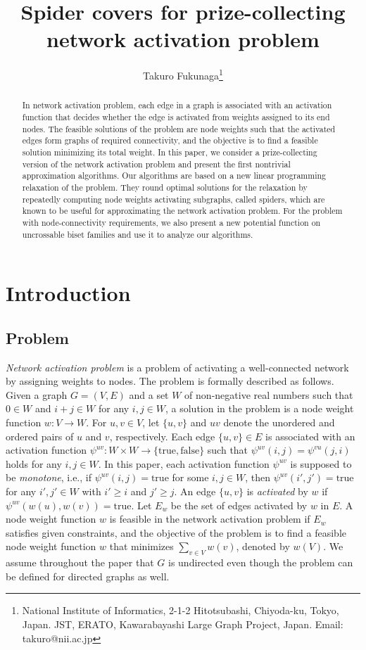 \documentclass[11pt]{article}
\title{Spider covers for prize-collecting network activation problem}
\author{Takuro Fukunaga\footnote{National Institute of Informatics,
2-1-2 Hitotsubashi, Chiyoda-ku, Tokyo, Japan.
JST, ERATO, Kawarabayashi Large Graph Project, Japan.
Email: takuro@nii.ac.jp}}
\date{}
\newcommand{\true}{\mbox{true}}
\newcommand{\false}{\mbox{false}}
\begin{document}
\maketitle
\begin{abstract}
In network activation problem, each edge in a graph is associated with an
 activation function that decides 
 whether the edge is activated from weights assigned
 to its end nodes.
 The feasible solutions of the problem are node weights such that the
 activated edges form graphs of required connectivity,
 and the objective is to find a feasible solution minimizing its total
 weight.
 In this paper, we consider a prize-collecting version of the network
 activation problem and present the first nontrivial approximation algorithms.
 Our algorithms are based on a new linear programming relaxation of the problem.
 They round optimal solutions for the relaxation by repeatedly computing
 node weights
 activating subgraphs, called spiders, which are known to be useful for
 approximating the network activation problem.
 For the problem with node-connectivity requirements, we also present a new
 potential function on uncrossable biset families
 and use it to analyze our algorithms.
\end{abstract}

\section{Introduction}
\subsection{Problem}
{\em Network activation problem}
is a problem of 
activating a well-connected network by assigning weights to
nodes.
The problem is formally described as follows. Given a graph $G=(V,E)$ and
a set $W$ of non-negative real numbers such that $0 \in W$ and
$i + j \in W$ for any $i,j \in W$,
a solution in the problem is a
node weight function $w\colon V \rightarrow W$.
For $u,v\in V$,
let $\{u,v\}$ and $uv$ 
denote the unordered and ordered pairs of $u$ and $v$, respectively.
Each edge $\{u,v\} \in E$ is associated with an activation function $\psi^{uv}: W
\times W \rightarrow \{\true,\false\}$ such that
$\psi^{uv}(i,j)=\psi^{vu}(j,i)$ holds for any $i,j \in W$.
In this paper, each activation function $\psi^{uv}$ is supposed to be
{\em monotone}, i.e.,
if $\psi^{uv}(i,j)=\true$ for some $i,j \in W$,
then $\psi^{uv}(i',j')=\true$ for any $i',j'\in W$ with $i' \geq i$ and $j' \geq j$.
An edge $\{u,v\}$ is \emph{activated} by $w$ if
$\psi^{uv}(w(u),w(v))=\true$.
Let $E_{w}$ be the set of edges activated by $w$ in $E$.
A node weight function $w$ is feasible 
in the network activation problem
if $E_{w}$ satisfies given constraints, and the objective of the problem is to find a feasible
node weight function $w$ that minimizes $\sum_{v \in V}w(v)$, denoted by
$w(V)$. 
We assume throughout the paper that $G$ is undirected even though
the problem can be defined for directed graphs as well.
\end{document}
